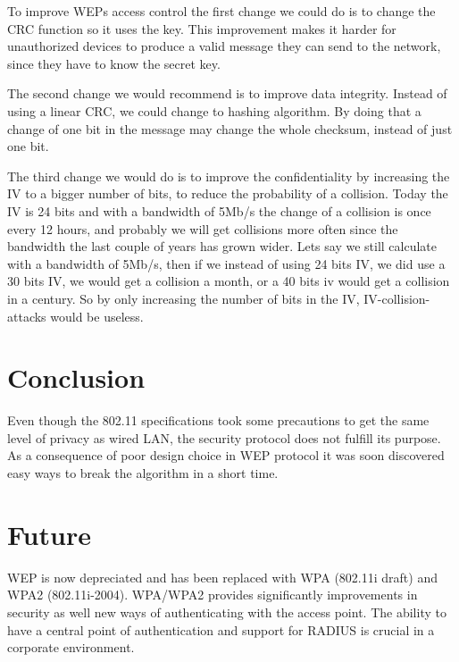 \documentclass[twocolumn,11pt]{IEEEtran}
\begin{document}
To improve WEPs access control the first change we could do is to change the CRC function so it uses the key. This improvement makes it harder for unauthorized devices to produce a valid message they can send to the network, since they have to know the secret key. 

The second change we would recommend is to improve data integrity. Instead of using a linear CRC, we could change to hashing algorithm. By doing that a change of one bit in the message may change the whole checksum, instead of just one bit. 

The third change we would do is to improve the confidentiality by increasing the IV to a bigger number of bits, to reduce the probability of a collision. Today the IV is 24 bits and with a bandwidth of 5Mb/s the change of a collision is once every 12 hours, and probably we will get collisions more often since the bandwidth the last couple of years has grown wider. Lets say we still calculate with a bandwidth of 5Mb/s, then if we instead of using 24 bits IV, we did use a 30 bits IV, we would get a collision a month, or a 40 bits iv would get a collision in a century. So by only increasing the number of bits in the IV, IV-collision-attacks would be useless.

\section {Conclusion}
\label{sec:conclusion}

Even though the 802.11 specifications took some precautions to get the same level of privacy as wired LAN, the security protocol does not fulfill its purpose. As a consequence of poor design choice in WEP protocol it was soon discovered easy ways to break the algorithm in a short time. 

\section {Future}
\label{sec:future}

WEP is now depreciated and has been replaced with WPA (802.11i draft) and WPA2 (802.11i-2004). WPA/WPA2 provides significantly improvements in security as well new ways of authenticating with the access point. The ability to have a central point  of authentication and support for RADIUS is crucial in a corporate environment.





\end{document}
